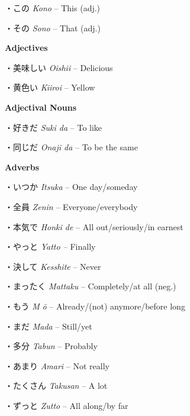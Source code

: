 \par{・この \emph{Kono }– This (adj.) }
 
\par{・その \emph{Sono }– That (adj.) }
 
\par{\textbf{Adjectives }}
 
\par{・美味しい \emph{Oishii }– Delicious }
 
\par{・黄色い \emph{Kiiroi }– Yellow }
 
\par{\textbf{Adjectival Nouns }}
 
\par{・好きだ \emph{Suki da }– To like }
 
\par{・同じだ \emph{Onaji da }– To be the same }
 
\par{\textbf{Adverbs }}
 
\par{・いつか \emph{Itsuka }– One day\slash someday }
 
\par{・全員 \emph{Zen\textquotesingle in }– Everyone\slash everybody }
 
\par{・本気で \emph{Honki de }– All out\slash seriously\slash in earnest }
 
\par{・やっと \emph{Yatto – }Finally }
 
\par{・決して \emph{Kesshite }– Never }
 
\par{・まったく \emph{Mattaku }– Completely\slash at all (neg.) }
 
\par{・もう \emph{M }\emph{ō }– Already\slash (not) anymore\slash before long }
 
\par{・まだ \emph{Mada }– Still\slash yet }
 
\par{・多分 \emph{Tabun }– Probably }
 
\par{・あまり \emph{Amari }– Not really }
 
\par{・たくさん \emph{Takusan }– A lot }
 
\par{・ずっと \emph{Zutto }– All along\slash by far }
 
